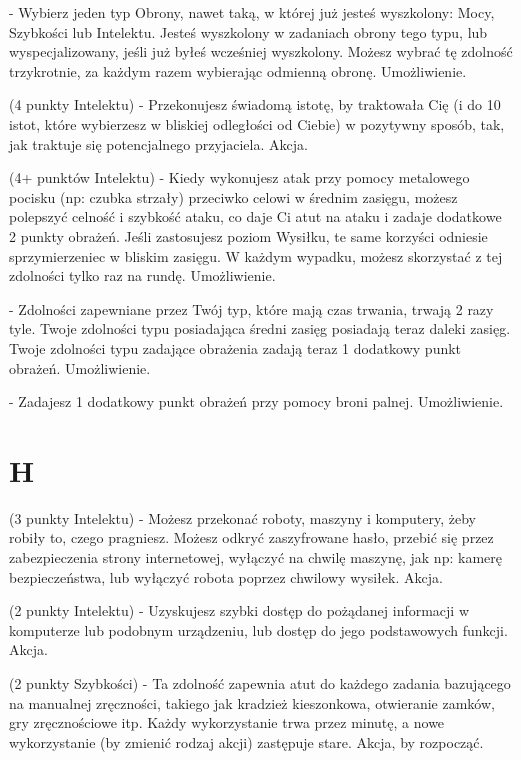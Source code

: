 { - Wybierz jeden typ Obrony, nawet taką, w której już jesteś wyszkolony: Mocy, Szybkości lub Intelektu. Jesteś wyszkolony w zadaniach obrony tego typu, lub wyspecjalizowany, jeśli już byłeś wcześniej wyszkolony. Możesz wybrać tę zdolność trzykrotnie, za każdym razem wybierając odmienną obronę. Umożliwienie.

 (4 punkty Intelektu) - Przekonujesz świadomą istotę, by traktowała Cię (i do 10 istot, które wybierzesz w bliskiej odległości od Ciebie) w pozytywny sposób, tak, jak traktuje się potencjalnego przyjaciela. Akcja.

 (4+ punktów Intelektu) - Kiedy wykonujesz atak przy pomocy metalowego pocisku (np: czubka strzały) przeciwko celowi w średnim zasięgu, możesz polepszyć celność i szybkość ataku, co daje Ci atut na ataku i zadaje dodatkowe 2 punkty obrażeń. Jeśli zastosujesz poziom Wysiłku, te same korzyści odniesie sprzymierzeniec w bliskim zasięgu. W każdym wypadku, możesz skorzystać z tej zdolności tylko raz na rundę. Umożliwienie. 

 - Zdolności zapewniane przez Twój typ, które mają czas trwania, trwają 2 razy tyle. Twoje zdolności typu posiadająca średni zasięg posiadają teraz daleki zasięg. Twoje zdolności typu zadające obrażenia zadają teraz 1 dodatkowy punkt obrażeń. Umożliwienie. 

 - Zadajesz 1 dodatkowy punkt obrażeń przy pomocy broni palnej. Umożliwienie.

\section{H}

 (3 punkty Intelektu) - Możesz przekonać roboty, maszyny i komputery, żeby robiły to, czego pragniesz. Możesz odkryć zaszyfrowane hasło, przebić się przez zabezpieczenia strony internetowej, wyłączyć na chwilę maszynę, jak np: kamerę bezpieczeństwa, lub wyłączyć robota poprzez chwilowy wysiłek. Akcja.

 (2 punkty Intelektu) - Uzyskujesz szybki dostęp do pożądanej informacji w komputerze lub podobnym urządzeniu, lub dostęp do jego podstawowych funkcji. Akcja.

 (2 punkty Szybkości) - Ta zdolność zapewnia atut do każdego zadania bazującego na manualnej zręczności, takiego jak kradzież kieszonkowa, otwieranie zamków, gry zręcznościowe itp. Każdy wykorzystanie trwa przez minutę, a nowe wykorzystanie (by zmienić rodzaj akcji) zastępuje stare. Akcja, by rozpocząć.

}
